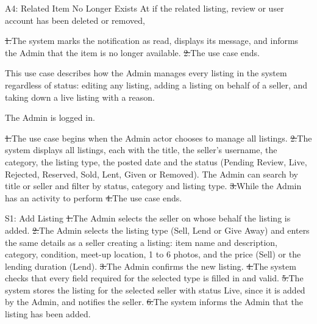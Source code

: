 \begin{flowblock}{A4: Related Item No Longer Exists}
At  if the related listing, review or user account has been deleted or removed,\par
\st{1.}{The system marks the notification as read, displays its message, and informs the Admin that the item is no longer available.}
\st{2.}{The use case ends.}
\end{flowblock}

This use case describes how the Admin manages every listing in the system regardless of status: editing any listing, adding a listing on behalf of a seller, and taking down a live listing with a reason.\par
{}
The Admin is logged in.\par
{}
\st{1.}{The use case begins when the Admin actor chooses to manage all listings.}
\st{2.}{The system displays all listings, each with the title, the seller's username, the category, the listing type, the posted date and the status (Pending Review, Live, Rejected, Reserved, Sold, Lent, Given or Removed). The Admin can search by title or seller and filter by status, category and listing type.}
\st{3.}{While the Admin has an activity to perform}
\st{4.}{The use case ends.}
\begin{flowblock}{S1: Add Listing}
\st{1.}{The Admin selects the seller on whose behalf the listing is added.}
\st{2.}{The Admin selects the listing type (Sell, Lend or Give Away) and enters the same details as a seller creating a listing: item name and description, category, condition, meet-up location, 1 to 6 photos, and the price (Sell) or the lending duration (Lend).}
\st{3.}{The Admin confirms the new listing.}
\st{4.}{The system checks that every field required for the selected type is filled in and valid.}
\st{5.}{The system stores the listing for the selected seller with status Live, since it is added by the Admin, and notifies the seller.}
\st{6.}{The system informs the Admin that the listing has been added.}
\end{flowblock}
